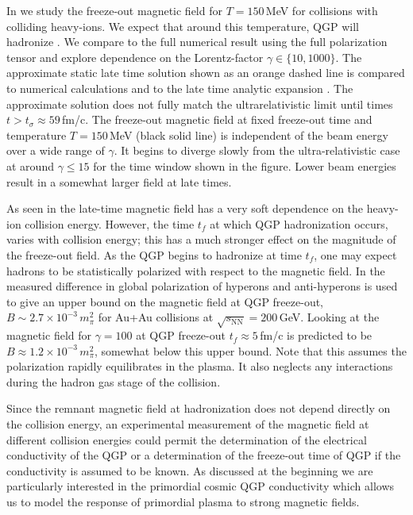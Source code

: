 In  we study the freeze-out magnetic field for $T= 150$\,MeV for collisions with colliding heavy-ions. We expect that around this temperature, QGP will hadronize \cite{Letessier:1992xd}.  We compare  to the full numerical result using the full polarization tensor  and explore dependence on the Lorentz-factor $\gamma\in\{10,1000\}$. The approximate static late time solution  shown as an orange dashed line is compared to numerical calculations  and to the late time analytic expansion . The approximate solution does not fully match the ultrarelativistic limit until times $t > t_{\sigma} \approx 59$\,fm/c. The freeze-out magnetic field at fixed freeze-out time and temperature $T= 150$\,MeV  (black solid line) is independent of the beam energy over a wide range of $\gamma$. It begins to diverge slowly from the ultra-relativistic case at around $\gamma \leq 15$ for the time window shown in the figure. Lower beam energies result in a somewhat larger field at late times.  

As seen in  the late-time magnetic field has a very soft dependence on the heavy-ion collision energy. However, the time $t_f$ at which QGP hadronization occurs, varies with collision energy; this has a much stronger effect on the magnitude of the freeze-out field.  As the QGP begins to hadronize at time $t_f$, one may expect hadrons to be statistically polarized with respect to the magnetic field. In \cite{Muller:2018ibh} the measured difference in global polarization of hyperons and anti-hyperons is used to give an upper bound on the magnetic field at QGP freeze-out, $B \sim 2.7\times 10^{-3}\,m_{\pi}^2$ for Au+Au collisions at $\sqrt{s_\text{NN}} = 200$\,GeV. Looking at  the magnetic field for $\gamma = 100$ at QGP freeze-out $t_f \approx 5 $\,fm/c is predicted to be $B \approx 1.2\times 10^{-3}\,m_{\pi}^2$, somewhat below this upper bound. Note that this assumes the polarization rapidly equilibrates in the plasma. It also neglects any interactions during the hadron gas stage  of the collision. 

Since the remnant magnetic field at hadronization does not depend directly on the collision energy, an experimental measurement of the magnetic field at different collision energies could permit the determination of the electrical conductivity of the QGP or a determination of the freeze-out time of QGP if the conductivity is assumed to be known. As discussed at the beginning we are particularly interested in the primordial cosmic QGP conductivity which allows us to model the response of primordial plasma to strong magnetic fields. 
